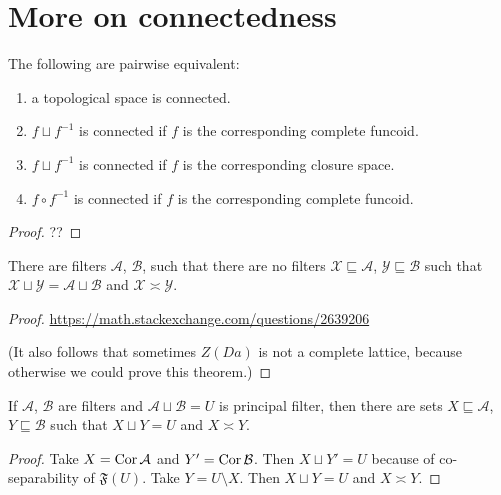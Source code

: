 \chapter{More on connectedness}

\begin{prop}
The following are pairwise equivalent:
\begin{enumerate}
 \item a topological space is connected.
 \item $f\sqcup f^{-1}$ is connected if $f$ is the corresponding
   complete funcoid.
 \item $f\sqcup f^{-1}$ is connected if $f$ is the corresponding
   closure space.
 \item $f\circ f^{-1}$ is connected if $f$ is the corresponding
   complete funcoid.
\end{enumerate}
\end{prop}

\begin{proof}
??
\end{proof}

\begin{prop}
  There are filters $\mathcal{A}$, $\mathcal{B}$, such that there are no
  filters $\mathcal{X} \sqsubseteq \mathcal{A}$, $\mathcal{Y} \sqsubseteq
  \mathcal{B}$ such that $\mathcal{X} \sqcup \mathcal{Y} = \mathcal{A} \sqcup
  \mathcal{B}$ and $\mathcal{X} \asymp \mathcal{Y}$.
\end{prop}

\begin{proof}
  \url{https://math.stackexchange.com/questions/2639206}

  (It also follows that sometimes $Z (D a)$ is not a complete lattice, because
  otherwise we could prove this theorem.)
\end{proof}

\begin{prop}
  If $\mathcal{A}$, $\mathcal{B}$ are filters and $\mathcal{A} \sqcup
  \mathcal{B} = U$ is principal filter, then there are sets $X \sqsubseteq
  \mathcal{A}$, $Y \sqsubseteq \mathcal{B}$ such that $X \sqcup Y = U$ and $X
  \asymp Y$.
\end{prop}

\begin{proof}
  Take $X = \operatorname{Cor} \mathcal{A}$ and $Y' = \operatorname{Cor} \mathcal{B}$. Then $X
  \sqcup Y' = U$ because of co-separability of $\mathfrak{F} (U)$. Take $Y = U
  \setminus X$. Then $X \sqcup Y = U$ and $X \asymp Y$.
\end{proof}

